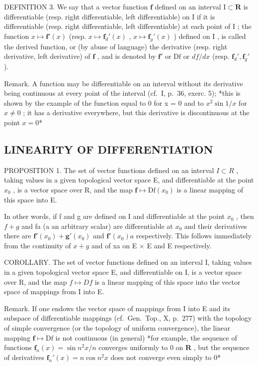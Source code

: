 DEFINITION 3. We say that a vector function \(\mathbf{f}\) defined on an interval \(\mathrm{I} \subset \mathbf{R}\) is differentiable (resp. right differentiable, left differentiable) on \(\mathrm{I}\) if it is differentiable (resp. right differentiable, left differentiable) at each point of \(\mathrm{I}\) ; the function \(x \mapsto \mathbf{f}'(x)\) (resp. \(x \mapsto \mathbf{f}_d'(x)\) , \(x \mapsto \mathbf{f}_g'(x)\) ) defined on \(\mathrm{I}\) , is called the derived function, or (by abuse of language) the derivative (resp. right derivative, left derivative) of \(\mathbf{f}\) , and is denoted by \(\mathbf{f}'\) or \(\mathrm{Df}\) or \(df/dx\) (resp. \(\mathbf{f}_d', \mathbf{f}_g'\) ).

Remark. A function may be differentiable on an interval without its derivative being continuous at every point of the interval (cf.~I, p.~36, exerc. 5); *this is shown by the example of the function equal to 0 for x = 0 and to \(x^{2} \sin 1/x\) for \(x \neq 0\) ; it has a derivative everywhere, but this derivative is discontinuous at the point \(x = 0\)*

\subsection{LINEARITY OF DIFFERENTIATION}

PROPOSITION 1. The set of vector functions defined on an interval \(I \subset R\) , taking values in a given topological vector space E, and differentiable at the point \(x_{0}\) , is a vector space over R, and the map \(\mathbf{f} \mapsto \mathrm{Df}(x_{0})\) is a linear mapping of this space into E.

In other words, if f and g are defined on I and differentiable at the point \(x_{0}\) , then \(f + g\) and fa (a an arbitrary scalar) are differentiable at \(x_{0}\) and their derivatives there are \(\mathbf{f}'(x_{0}) + \mathbf{g}'(x_{0})\) and \(\mathbf{f}'(x_{0})a\) respectively. This follows immediately from the continuity of \(x + y\) and of xa on E × E and E respectively.

COROLLARY. The set of vector functions defined on an interval I, taking values in a given topological vector space E, and differentiable on I, is a vector space over R, and the map \(f \mapsto Df\) is a linear mapping of this space into the vector space of mappings from I into E.

Remark. If one endows the vector space of mappings from I into E and its subspace of differentiable mappings (cf.~Gen.~Top., X, p.~277) with the topology of simple convergence (or the topology of uniform convergence), the linear mapping \(\mathbf{f} \mapsto \mathrm{Df}\) is not continuous (in general) *for example, the sequence of functions \(\mathbf{f}_n(x) = \sin n^2 x / n\) converges uniformly to 0 on \(\mathbf{R}\) , but the sequence of derivatives \(\mathbf{f}_n'(x) = n\cos n^2 x\) does not converge even simply to \(0\)*

